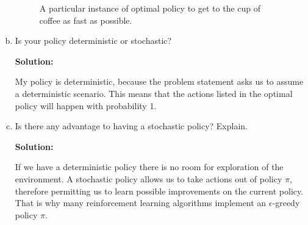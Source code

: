 \documentclass[12pt]{article}
\begin{document}
\begin{enumerate}[a)]
\begin{figure}[ht]
  \caption{\label{fig:prob1_optimal_policy} A particular instance of optimal policy to get to the cup of coffee as fast as possible.}
\end{figure}


\item Is your policy deterministic or stochastic?

\textbf{Solution:}

My policy is deterministic, because the problem statement asks us to assume a deterministic scenario. This means that the actions listed in the optimal policy will happen with probability 1.

\item Is there any advantage to having a stochastic policy? Explain.

\textbf{Solution:}

If we have a deterministic policy there is no room for exploration of the environment. A stochastic policy allows us to take actions out of policy $\pi$, therefore permitting us to learn possible improvements on the current policy. That is why many reinforcement learning algorithms implement an $\epsilon$-greedy policy $\pi$.


\end{enumerate}
\end{document}
